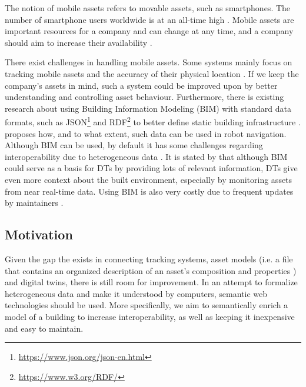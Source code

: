 \documentclass{article}
\begin{document}
The notion of mobile assets refers to movable assets, such as smartphones. The number of smartphone users worldwide is at an all-time high \cite{petroc_taylor_number_2023}. Mobile assets are important resources for a company and can change at any time, and a company should aim to increase their availability \cite{marcheta_development_2022}.

There exist challenges in handling mobile assets. Some systems mainly focus on tracking mobile assets and the accuracy of their physical location \cite{marcheta_development_2022,akram_design_2021}. If we keep the company's assets in mind, such a system could be improved upon by better understanding and controlling asset behaviour. Furthermore, there is existing research about using Building Information Modeling (BIM) with standard data formats, such as JSON\footnote{\url{https://www.json.org/json-en.html}} and RDF\footnote{\url{https://www.w3.org/RDF/}} to better define static building infrastructure \cite{pauwels_live_2023}. \citeauthor{pauwels_live_2023} proposes how, and to what extent, such data can be used in robot navigation. Although BIM can be used, by default it has some challenges regarding interoperability due to heterogeneous data \cite{dinis_bim_2022,godager_concept_2021}. It is stated by \citeauthor{godager_concept_2021} that although BIM could serve as a basis for DTs by providing lots of relevant information, DTs give even more context about the built environment, especially by monitoring assets from near real-time data. Using BIM is also very costly due to frequent updates by maintainers \cite{hamledari_ifc-based_2018}.


\subsection{Motivation}
Given the gap the exists in connecting tracking systems, asset models (i.e. a file that contains an organized description of an asset's composition and properties \cite{kamburjan_twinning-by-construction_2022}) and digital twins, there is still room for improvement. In an attempt to formalize heterogeneous data and make it understood by computers, semantic web technologies should be used. More specifically, we aim to semantically enrich a model of a building to increase interoperability, as well as keeping it inexpensive and easy to maintain.
\end{document}
